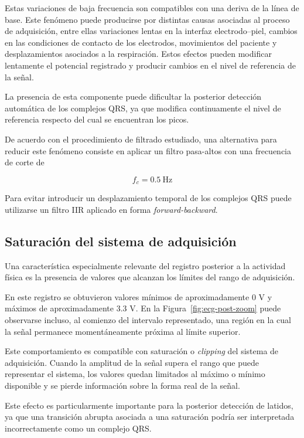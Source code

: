\documentclass[12pt,a4paper]{article}
\begin{document}
Estas variaciones de baja frecuencia son compatibles con una deriva de la línea
de base. Este fenómeno puede producirse por distintas causas asociadas al
proceso de adquisición, entre ellas variaciones lentas en la interfaz
electrodo--piel, cambios en las condiciones de contacto de los electrodos,
movimientos del paciente y desplazamientos asociados a la respiración. Estos
efectos pueden modificar lentamente el potencial registrado y producir cambios
en el nivel de referencia de la señal.

La presencia de esta componente puede dificultar la posterior detección
automática de los complejos QRS, ya que modifica continuamente el nivel de
referencia respecto del cual se encuentran los picos.

De acuerdo con el procedimiento de filtrado estudiado, una alternativa para
reducir este fenómeno consiste en aplicar un filtro pasa-altos con una frecuencia
de corte de

\[
f_c = 0.5~\mathrm{Hz}
\]

Para evitar introducir un desplazamiento temporal de los complejos QRS puede
utilizarse un filtro IIR aplicado en forma \textit{forward-backward}.

\subsection{Saturación del sistema de adquisición}

Una característica especialmente relevante del registro posterior a la
actividad física es la presencia de valores que alcanzan los límites del rango
de adquisición.

En este registro se obtuvieron valores mínimos de aproximadamente 0 V y máximos
de aproximadamente 3.3 V. En la Figura~\ref{fig:ecg-post-zoom} puede observarse
incluso, al comienzo del intervalo representado, una región en la cual la señal
permanece momentáneamente próxima al límite superior.

Este comportamiento es compatible con saturación o \textit{clipping} del sistema
de adquisición. Cuando la amplitud de la señal supera el rango que puede
representar el sistema, los valores quedan limitados al máximo o mínimo
disponible y se pierde información sobre la forma real de la señal.

Este efecto es particularmente importante para la posterior detección de
latidos, ya que una transición abrupta asociada a una saturación podría ser
interpretada incorrectamente como un complejo QRS.
\end{document}
